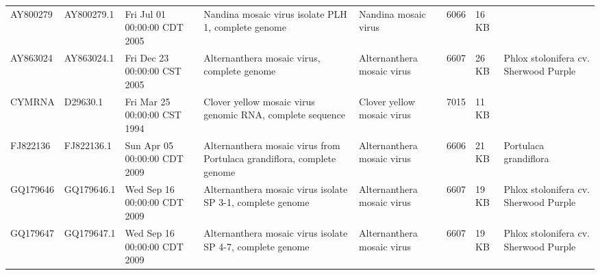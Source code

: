\documentclass[11pt]{article}
\begin{document}
\begin{supptable}[ht]
{\begin{tabular}{@{}llllllll@{}}
AY800279 & AY800279.1 & Fri Jul 01 00:00:00 CDT 2005 & Nandina mosaic virus isolate PLH 1, complete genome                                                                                                                                                                                                              & Nandina mosaic virus           & 6066            & 16 KB &                                       \\
AY863024 & AY863024.1 & Fri Dec 23 00:00:00 CST 2005 & Alternanthera mosaic virus, complete genome                                                                                                                                                                                                                      & Alternanthera mosaic virus     & 6607            & 26 KB & Phlox stolonifera cv. Sherwood Purple \\
CYMRNA   & D29630.1   & Fri Mar 25 00:00:00 CST 1994 & Clover yellow mosaic virus genomic RNA, complete sequence                                                                                                                                                                                                        & Clover yellow mosaic virus     & 7015            & 11 KB &                                       \\
FJ822136 & FJ822136.1 & Sun Apr 05 00:00:00 CDT 2009 & Alternanthera mosaic virus from Portulaca grandiflora, complete genome                                                                                                                                                                                           & Alternanthera mosaic virus     & 6606            & 21 KB & Portulaca grandiflora                 \\
GQ179646 & GQ179646.1 & Wed Sep 16 00:00:00 CDT 2009 & Alternanthera mosaic virus isolate SP 3-1, complete genome                                                                                                                                                                                                       & Alternanthera mosaic virus     & 6607            & 19 KB & Phlox stolonifera cv. Sherwood Purple \\
GQ179647 & GQ179647.1 & Wed Sep 16 00:00:00 CDT 2009 & Alternanthera mosaic virus isolate SP 4-7, complete genome                                                                                                                                                                                                       & Alternanthera mosaic virus     & 6607            & 19 KB & Phlox stolonifera cv. Sherwood Purple \\

\end{tabular}}
\end{supptable}
\end{document}
